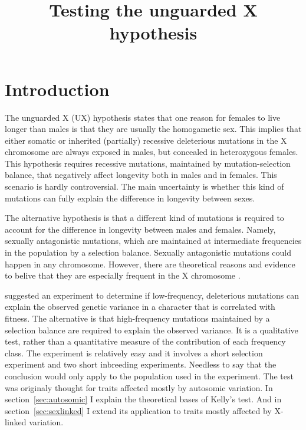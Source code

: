 \documentclass[a4paper,12pt]{article}
\title{Testing the unguarded X hypothesis}
\begin{document}
\maketitle
\section{Introduction}
The unguarded X (UX) hypothesis states that one reason for females to live longer than males is that they are usually the homogametic sex. This implies that either somatic or inherited (partially) recessive deleterious mutations in the X chromosome are always exposed in males, but concealed in heterozygous females. This hypothesis requires recessive mutations, maintained by mutation-selection balance, that negatively affect longevity both in males and in females. This scenario is hardly controversial. The main uncertainty is whether this kind of mutations can fully explain the difference in longevity between sexes.

The alternative hypothesis is that a different kind of mutations is required to account for the difference in longevity between males and females. Namely, sexually antagonistic mutations, which are maintained at intermediate frequencies in the population by a selection balance. Sexually antagonistic mutations could happen in any chromosome. However, there are theoretical reasons and evidence to belive that they are especially frequent in the X chromosome \citep{Gibson2002}.

\citet{Kelly1999} suggested an experiment to determine if low-frequency, deleterious mutations can explain the observed genetic variance in a character that is correlated with fitness. The alternative is that high-frequency mutations maintained by a selection balance are required to explain the observed variance. It is a qualitative test, rather than a quantitative measure of the contribution of each frequency class. The experiment is relatively easy and it involves a short selection experiment and two short inbreeding experiments. Needless to say that the conclusion would only apply to the population used in the experiment. The test was originaly thought for traits affected mostly by autosomic variation. In section~\ref{sec:autosomic} I explain the theoretical bases of Kelly's test. And in section~\ref{sec:sexlinked} I extend its application to traits mostly affected by X-linked variation.
\end{document}
